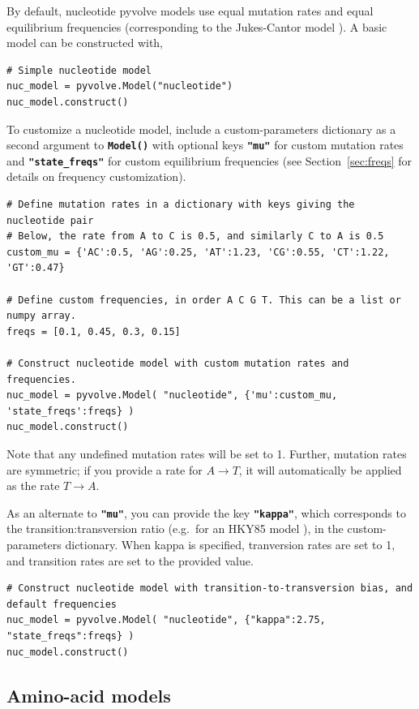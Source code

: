 \documentclass{article}
\newcommand{\code}[1]{\textbf{\texttt{\small{#1}}}}
\begin{document}
By default, nucleotide pyvolve models use equal mutation rates and equal equilibrium frequencies (corresponding to the Jukes-Cantor model \citep{JC69}). A basic model can be constructed with, 
\begin{lstlisting}
# Simple nucleotide model 
nuc_model = pyvolve.Model("nucleotide")
nuc_model.construct()
\end{lstlisting}

To customize a nucleotide model, include a custom-parameters dictionary as a second argument to \code{Model()} with optional keys \code{"mu"} for custom mutation rates and \code{"state\_freqs"} for custom equilibrium frequencies (see Section~\ref{sec:freqs} for details on frequency customization). 
\begin{lstlisting}
# Define mutation rates in a dictionary with keys giving the nucleotide pair
# Below, the rate from A to C is 0.5, and similarly C to A is 0.5
custom_mu = {'AC':0.5, 'AG':0.25, 'AT':1.23, 'CG':0.55, 'CT':1.22, 'GT':0.47} 

# Define custom frequencies, in order A C G T. This can be a list or numpy array.
freqs = [0.1, 0.45, 0.3, 0.15]

# Construct nucleotide model with custom mutation rates and frequencies.
nuc_model = pyvolve.Model( "nucleotide", {'mu':custom_mu, 'state_freqs':freqs} )
nuc_model.construct()
\end{lstlisting}
Note that any undefined mutation rates will be set to 1. Further, mutation rates are symmetric; if you provide a rate for $A \rightarrow T$, it will automatically be applied as the rate $T \rightarrow A$. 

As an alternate to \code{"mu"}, you can provide the key \code{"kappa"}, which corresponds to the transition:transversion ratio (e.g.\ for an HKY85  model \citep{HKY85}), in the custom-parameters dictionary. When kappa is specified, tranversion rates are set to 1, and transition rates are set to the provided value.

\begin{lstlisting}
# Construct nucleotide model with transition-to-transversion bias, and default frequencies
nuc_model = pyvolve.Model( "nucleotide", {"kappa":2.75, "state_freqs":freqs} )
nuc_model.construct()
\end{lstlisting}


\subsection{Amino-acid models}\label{sec:amino_basic}
\end{document}
